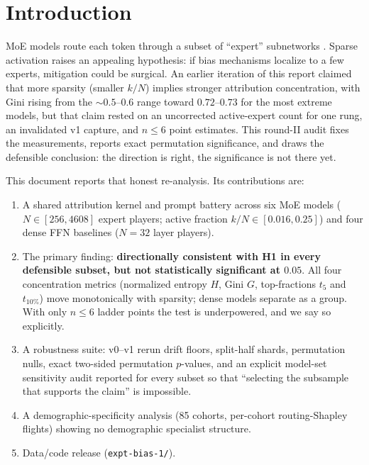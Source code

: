 \documentclass[sigconf]{acmart}
\begin{document}

\maketitle

\section{Introduction}
\label{sec:intro}
MoE models route each token through a subset of ``expert'' subnetworks
\cite{shazeer2017,fedus2022,jiang2024,cai2024}. Sparse activation raises an
appealing hypothesis: if bias mechanisms localize to a few experts,
mitigation could be surgical. An earlier iteration of this report claimed
that more sparsity (smaller $k/N$) implies stronger attribution
concentration, with Gini rising from the $\sim 0.5$--$0.6$ range toward
$0.72$--$0.73$ for the most extreme models, but that claim rested on an
uncorrected active-expert count for one rung, an invalidated v1 capture, and
$n \le 6$ point estimates. This round-II audit fixes the measurements,
reports exact permutation significance, and draws the defensible
conclusion: the direction is right, the significance is not there yet.

This document reports that honest re-analysis. Its contributions are:
\begin{enumerate}
\item A shared attribution kernel and prompt battery across six MoE models
($N \in [256, 4608]$ expert players; active fraction $k/N \in [0.016, 0.25]$)
and four dense FFN baselines ($N = 32$ layer players).
\item The primary finding: \textbf{directionally consistent with H1 in
every defensible subset, but not statistically significant at $0.05$}.
All four concentration metrics (normalized entropy $H$, Gini $G$,
top-fractions $t_5$ and $t_{10\%}$) move monotonically with sparsity;
dense models separate as a group. With only $n \le 6$ ladder points the
test is underpowered, and we say so explicitly.
\item A robustness suite: v0--v1 rerun drift floors, split-half shards,
permutation nulls, exact two-sided permutation $p$-values, and an explicit
model-set sensitivity audit reported for every subset so that ``selecting
the subsample that supports the claim'' is impossible.
\item A demographic-specificity analysis (85 cohorts, per-cohort
routing-Shapley flights) showing no demographic specialist structure.
\item Data/code release (\texttt{expt-bias-1/}).
\end{enumerate}
\end{document}
